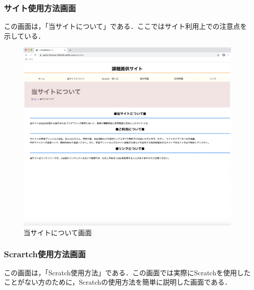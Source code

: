 \subsubsection{サイト使用方法画面}
この画面は，「当サイトについて」である．ここではサイト利用上での注意点を示している．
\begin{figure}[h]
\begin{center}
\includegraphics[width=15cm]{site.pdf}
\caption{当サイトについて画面}
\label{fig:houhou}
\end{center}
\end{figure}

\newpage

\subsubsection{Scrartch使用方法画面}
この画面は，「Scratch使用方法」である．この画面では実際にScratchを使用したことがない方のために，Scratchの使用方法を簡単に説明した画面である．

